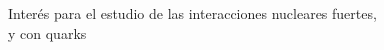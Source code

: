 \documentclass[preview]{standalone}
\begin{document}
\begin{center}
Interés para el estudio de las interacciones nucleares fuertes, \\y con quarks
\end{center}
\end{document}
